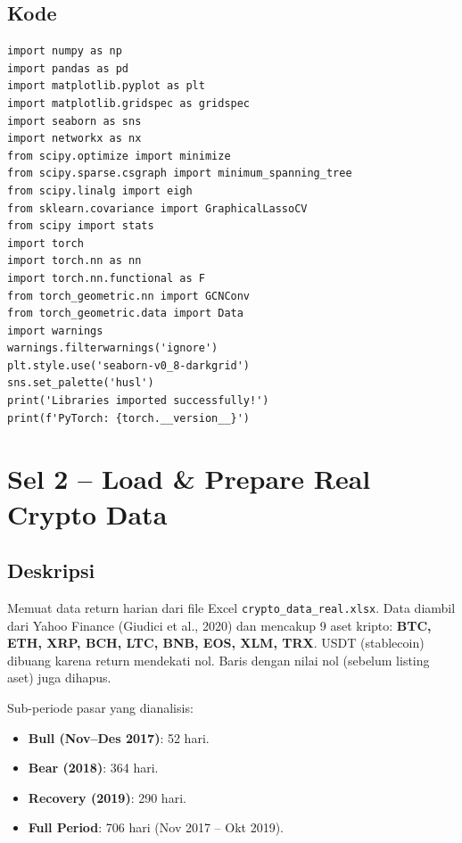 \documentclass[12pt,a4paper]{article}
\begin{document}
\subsection{Kode}
\begin{lstlisting}[caption={Import libraries}]
import numpy as np
import pandas as pd
import matplotlib.pyplot as plt
import matplotlib.gridspec as gridspec
import seaborn as sns
import networkx as nx
from scipy.optimize import minimize
from scipy.sparse.csgraph import minimum_spanning_tree
from scipy.linalg import eigh
from sklearn.covariance import GraphicalLassoCV
from scipy import stats
import torch
import torch.nn as nn
import torch.nn.functional as F
from torch_geometric.nn import GCNConv
from torch_geometric.data import Data
import warnings
warnings.filterwarnings('ignore')
plt.style.use('seaborn-v0_8-darkgrid')
sns.set_palette('husl')
print('Libraries imported successfully!')
print(f'PyTorch: {torch.__version__}')
\end{lstlisting}

\section{Sel 2 -- Load \& Prepare Real Crypto Data}

\subsection{Deskripsi}
Memuat data return harian dari file Excel \texttt{crypto\_data\_real.xlsx}.
Data diambil dari Yahoo Finance (Giudici et al., 2020) dan mencakup 9 aset kripto:
\textbf{BTC, ETH, XRP, BCH, LTC, BNB, EOS, XLM, TRX}.
USDT (stablecoin) dibuang karena return mendekati nol.
Baris dengan nilai nol (sebelum listing aset) juga dihapus.

Sub-periode pasar yang dianalisis:
\begin{itemize}
    \item \textbf{Bull (Nov--Des 2017)}: 52 hari.
    \item \textbf{Bear (2018)}: 364 hari.
    \item \textbf{Recovery (2019)}: 290 hari.
    \item \textbf{Full Period}: 706 hari (Nov 2017 -- Okt 2019).
\end{itemize}
\end{document}
